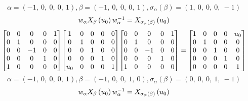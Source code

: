 \documentclass[11pt]{article}
\theoremstyle{definition}
\begin{document}
\providecommand{\scaletoalign}[2]{%
  \sbox0{$#2$}%
  \ifdim\wd0>#1\relax 
    \resizebox{#1}{!}{\usebox0}%
  \else 
    \usebox0%
  \fi 
}
\[
\alpha = \left( -1, \  0, \  0, \  0, \  1\right), \beta = \left( -1, \  0, \  0, \  0, \  1\right), \sigma_{\alpha}(\beta) = \left( 1, \  0, \  0, \  0, \  -1\right)
\]
\[
\scaletoalign{\textwidth}{w_{\alpha} X_{\beta}\left(u_{0}\right) w_{\alpha}^{-1} = X_{\sigma_{\alpha}\left(\beta\right)}\left(u_{0}\right)}
\]
\[
\scaletoalign{\textwidth}{{\left[\begin{matrix}0 & 0 & 0 & 0 & 1\\0 & 1 & 0 & 0 & 0\\0 & 0 & -1 & 0 & 0\\0 & 0 & 0 & 1 & 0\\1 & 0 & 0 & 0 & 0\end{matrix}\right]} {\left[\begin{matrix}1 & 0 & 0 & 0 & 0\\0 & 1 & 0 & 0 & 0\\0 & 0 & 1 & 0 & 0\\0 & 0 & 0 & 1 & 0\\u_{0} & 0 & 0 & 0 & 1\end{matrix}\right]} {\left[\begin{matrix}0 & 0 & 0 & 0 & 1\\0 & 1 & 0 & 0 & 0\\0 & 0 & -1 & 0 & 0\\0 & 0 & 0 & 1 & 0\\1 & 0 & 0 & 0 & 0\end{matrix}\right]} = {\left[\begin{matrix}1 & 0 & 0 & 0 & u_{0}\\0 & 1 & 0 & 0 & 0\\0 & 0 & 1 & 0 & 0\\0 & 0 & 0 & 1 & 0\\0 & 0 & 0 & 0 & 1\end{matrix}\right]}}
\]
\[
\alpha = \left( -1, \  0, \  0, \  0, \  1\right), \beta = \left( -1, \  0, \  0, \  1, \  0\right), \sigma_{\alpha}(\beta) = \left( 0, \  0, \  0, \  1, \  -1\right)
\]
\[
\scaletoalign{\textwidth}{w_{\alpha} X_{\beta}\left(u_{0}\right) w_{\alpha}^{-1} = X_{\sigma_{\alpha}\left(\beta\right)}\left(u_{0}\right)}
\]
\end{document}
